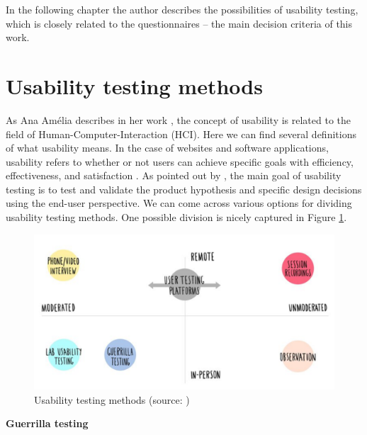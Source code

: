 \documentclass[a4paper,10pt,twoside]{article}
\begin{document}
\noindent In the following chapter the author describes the possibilities of usability testing, which is closely related to the questionnaires -- the main decision criteria of this work.

\newpage
\vspace*{-1cm}
\section{Usability testing methods}
\label{sec:usability_testing}

\noindent As Ana Amélia describes in her work \cite{amelia}, the
concept of usability is related to the field of
Human-Computer-Interaction (HCI). Here we can find several definitions
of what usability means. In the case of websites and software
applications, usability refers to whether or not users can achieve
specific goals with efficiency, effectiveness, and satisfaction
\cite{dishman}. As pointed out by \cite{hotjar}, the main goal of
usability testing is to test and validate the product hypothesis and
specific design decisions using the end-user perspective. We can come
across various options for dividing usability testing methods. One
possible division is nicely captured in Figure
\ref{fig:usability_testing_methods}.

\vspace{0.3cm}
\begin{figure}[hbt!] 
\begin{center}
\includegraphics[width=13cm]{../pictures/usability_testing_methods.png} 
\caption[Usability testing methods]{Usability testing methods (source: \cite{hotjar})}
\label{fig:usability_testing_methods}
\end{center}
\end{figure}

\noindent \textbf {Guerrilla testing}
\end{document}
